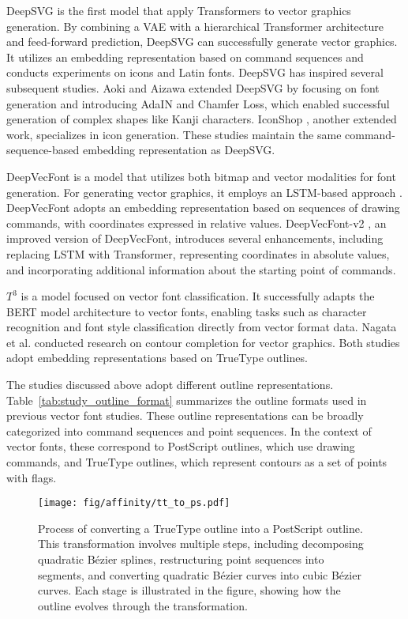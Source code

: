 DeepSVG \cite{carlier2020deepsvg} is the first model that apply Transformers to vector graphics generation.
By combining a VAE \cite{kingma2022auto} with a hierarchical Transformer architecture and feed-forward prediction, DeepSVG can successfully generate vector graphics.
It utilizes an embedding representation based on command sequences and conducts experiments on icons and Latin fonts.
DeepSVG has inspired several subsequent studies.
Aoki and Aizawa \cite{aoki2022svg} extended DeepSVG by focusing on font generation and introducing AdaIN \cite{huang2017arbitrary} and Chamfer Loss, which enabled successful generation of complex shapes like Kanji characters.
IconShop \cite{wu2023iconshop}, another extended work, specializes in icon generation.
These studies maintain the same command-sequence-based embedding representation as DeepSVG.

DeepVecFont \cite{wang2021deepvecfont} is a model that utilizes both bitmap and vector modalities for font generation.
For generating vector graphics, it employs an LSTM-based approach \cite{hochreiter1997lstm}.
DeepVecFont adopts an embedding representation based on sequences of drawing commands, with coordinates expressed in relative values.
DeepVecFont-v2 \cite{wang2023deepvecfontv2}, an improved version of DeepVecFont, introduces several enhancements,
including replacing LSTM with Transformer, representing coordinates in absolute values, and incorporating additional information about the starting point of commands.

$T^3$ \cite{nagata2022truetype} is a model focused on vector font classification.
It successfully adapts the BERT model architecture to vector fonts, enabling tasks such as character recognition and font style classification directly from vector format data.
Nagata et al. \cite{nagata2023contour} conducted research on contour completion for vector graphics.
Both studies adopt embedding representations based on TrueType outlines.

The studies discussed above adopt different outline representations.
Table~\ref{tab:study_outline_format} summarizes the outline formats used in previous vector font studies.
These outline representations can be broadly categorized into command sequences and point sequences.
In the context of vector fonts, these correspond to PostScript outlines, which use drawing commands, and TrueType outlines, which represent contours as a set of points with flags.

\begin{figure*}[!t]
    \centerline{\texttt{[image: fig/affinity/tt\_to\_ps.pdf]}}
    \caption{
        Process of converting a TrueType outline into a PostScript outline.
        This transformation involves multiple steps, including decomposing quadratic Bézier splines, restructuring point sequences into segments, and converting quadratic Bézier curves into cubic Bézier curves.
        Each stage is illustrated in the figure, showing how the outline evolves through the transformation.
    }
    \label{fig:tt_to_ps}
\end{figure*}